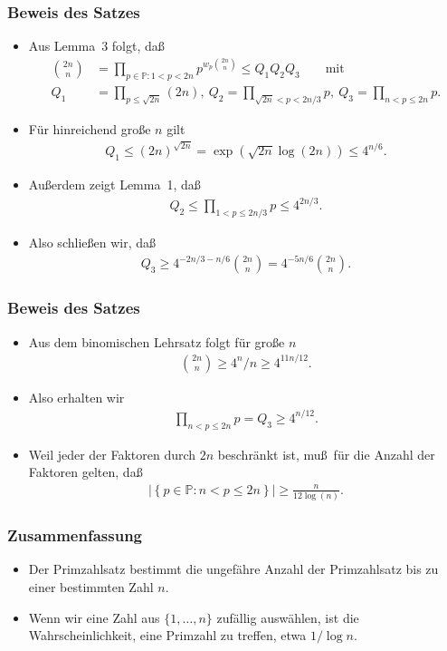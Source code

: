 \documentclass{beamer}
\newcommand\PP{\mathbb P}
\newcommand{\abs}[1]{\left|#1\right|}
\newcommand\cbc[1]{\left\{{#1}\right\}}
\renewcommand{\ae}{\"a}
\newcommand{\ue}{\"u}
\begin{document}
\begin{frame}\frametitle{Beweis des Satzes}
	\begin{itemize}
		\item Aus Lemma~3 folgt, da\ss\ 
			\begin{align*}
				\binom{2n}n&=\prod_{p\in\PP:1<p<2n}p^{w_p\binom{2n}n}\leq Q_1Q_2Q_3\qquad\mbox{mit}\\
				Q_1&=\prod_{p\leq\sqrt{2n}}(2n),\ Q_2=\prod_{\sqrt{2n}<p<2n/3}p,\ Q_3=\prod_{n<p\leq 2n}p.
			\end{align*}
		\item F\ue r hinreichend gro\ss e $n$ gilt 
			\begin{align*}
				Q_1\leq (2n)^{\sqrt{2n}}=\exp(\sqrt{2n}\log(2n))\leq 4^{n/6}.
			\end{align*}
		\item Au\ss erdem zeigt Lemma~1, da\ss\ 
			\begin{align*}
				Q_2\leq \prod_{1<p\leq 2n/3}p\leq 4^{2n/3}.
			\end{align*}
		\item Also schlie\ss en wir, da\ss\ 
			\begin{align*}
				Q_3\geq 4^{-2n/3-n/6}\binom{2n}n=4^{-5n/6}\binom{2n}n.
			\end{align*}
	\end{itemize}
\end{frame}

\begin{frame}\frametitle{Beweis des Satzes}
	\begin{itemize}
		\item Aus dem binomischen Lehrsatz folgt f\ue r gro\ss e $n$
			\begin{align*}
				\binom{2n}n\geq 4^n/n\geq 4^{11n/12}.
			\end{align*}
		\item Also erhalten wir
			\begin{align*}
				\prod_{n<p\leq 2n}p=Q_3\geq 4^{n/12}.
			\end{align*}
		\item Weil jeder der Faktoren durch $2n$ beschr\ae nkt ist, mu\ss\ f\ue r die Anzahl der Faktoren gelten, da\ss\
			\begin{align*}
				\abs{\cbc{p\in\PP:n<p\leq 2n}}\geq\frac{n}{12\log(n)}.
			\end{align*}
	\end{itemize}
\end{frame}

\begin{frame}\frametitle{Zusammenfassung}
\begin{itemize}
\item Der Primzahlsatz bestimmt die ungef\ae hre Anzahl der Primzahlsatz bis zu einer bestimmten Zahl $n$.
\item Wenn wir eine Zahl aus $\{1,\ldots,n\}$ zuf\ae llig ausw\ae hlen, ist die Wahrscheinlichkeit, eine Primzahl zu treffen, etwa $1/\log n$.
\end{itemize}
\end{frame}
\end{document}
